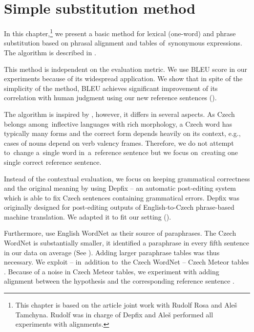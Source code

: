 \chapter{Simple substitution method}

In this chapter,\footnote{This chapter is based on the article 
\citep{barancikova:2014} joint work with Rudolf Rosa and Ale\v{s} Tamchyna.
Rudolf was in charge of Depfix and Ale\v{s} performed all experiments with 
alignments. } 
we present a basic method for lexical (one-word) and phrase 
substitution based on phrasal alignment and tables of~synonymous 
expressions. The algorithm is described in .

This method is independent on the evaluation metric. We use BLEU score in our 
experiments because of its widespread application.  We show that in spite of the 
simplicity of the method, BLEU achieves significant improvement of its 
correlation with human judgment using our new reference sentences ().

The algorithm is inspired by \cite{kauchak}, however, it differs in several 
aspects. As Czech belongs among~inflective languages with rich morphology, a 
Czech word has typically many forms and the correct form depends heavily on its 
context, e.g., cases of nouns depend on verb valency frames. Therefore, we do 
not attempt to~change a~single word in~a~reference sentence but we focus 
on~creating one single correct reference sentence.

Instead of the contextual evaluation, we focus on keeping grammatical 
correctness and the original meaning by using Depfix \citep{depfix} -- an 
automatic post-editing system which is able to fix Czech sentences containing 
grammatical errors. Depfix was originally designed for post-editing outputs of 
English-to-Czech phrase-based machine translation. We adapted it to fit our 
setting ().

Furthermore, \citet{kauchak} use English WordNet as their source of paraphrases.
The Czech WordNet \citep{czech-wordnet} is substantially smaller, it identified a
paraphrase in every fifth sentence in our data on average (See 
). Adding larger paraphrase tables was thus necessary.
We exploit --  in~addition to~the Czech WordNet --  Czech Meteor tables 
\citep{meteor-tables}.  Because of a noise in Czech Meteor tables, we 
experiment with adding alignment between the hypothesis and the corresponding 
reference sentence .



